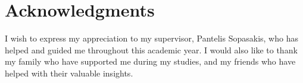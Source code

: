 \section{Acknowledgments}

I wish to express my appreciation to my supervisor, Pantelis Sopasakis, who has helped and guided me throughout this academic year. I would also like to thank my family who have supported me during my studies, and my friends who have helped with their valuable insights.
